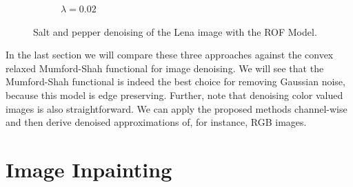 \documentclass[abstracton]{scrreprt}
\begin{document}
\begin{figure}[!ht]
\begin{subfigure}[b]{0.24\textwidth}
                    \caption{$\lambda = 0.02$}
                \end{subfigure}
                \caption[Salt and pepper denoising example: ROF.]{Salt and pepper denoising of the Lena image with the ROF Model.}
            \label{fig:denoising_lena_rof_sap}
            \end{figure}

        In the last section we will compare these three approaches against the convex relaxed Mumford-Shah functional for image denoising. We will see that the Mumford-Shah functional is indeed the best choice for removing Gaussian noise, because this model is edge preserving. Further, note that denoising color valued images is also straightforward. We can apply the proposed methods channel-wise and then derive denoised approximations of, for instance, RGB images.


    \section{Image Inpainting} %
    \label{sec:image_inpainting}
\end{document}
